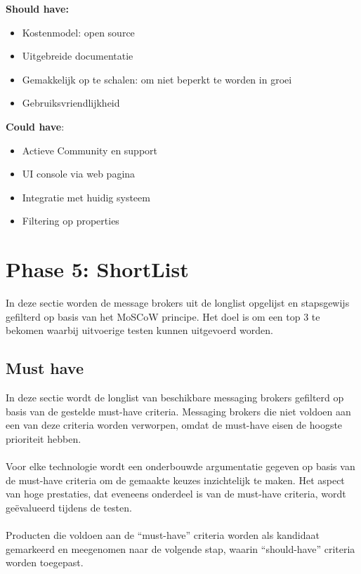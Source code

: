 \textbf{Should have:}
\begin{itemize}
  \item Kostenmodel: open source 
  \item Uitgebreide documentatie
  \item Gemakkelijk op te schalen: om niet beperkt te worden in groei
  \item Gebruiksvriendlijkheid
\end{itemize}

\textbf{Could have}:
\begin{itemize}
  \item Actieve Community en support
  \item UI console via web pagina
  \item Integratie met huidig systeem
  \item Filtering op properties
\end{itemize}

\newpage
\section{Phase 5: ShortList}
In deze sectie worden de message brokers uit de longlist opgelijst en stapsgewijs gefilterd op basis van het MoSCoW principe.
Het doel is om een top 3 te bekomen waarbij uitvoerige testen kunnen uitgevoerd worden.

\subsection{Must have}
In deze sectie wordt de longlist van beschikbare messaging brokers gefilterd op basis van de gestelde must-have criteria. 
Messaging brokers die niet voldoen aan een van deze criteria worden verworpen, omdat de must-have eisen de hoogste prioriteit hebben.
\\\\
Voor elke technologie wordt een onderbouwde argumentatie gegeven op basis van de must-have criteria om de gemaakte keuzes inzichtelijk te maken. 
Het aspect van hoge prestaties, dat eveneens onderdeel is van de must-have criteria, wordt geëvalueerd tijdens de testen.
\\\\
Producten die voldoen aan de ``must-have'' criteria worden als kandidaat gemarkeerd en meegenomen naar de volgende stap, waarin ``should-have'' criteria worden toegepast.
 
